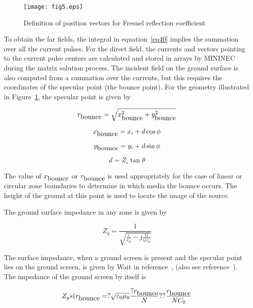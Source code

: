 \documentclass[12pt]{article}
\begin{document}
\begin{figure}[htb]
\centerline{\texttt{[image: fig5.eps]}}
\caption{Definition of position vectors for Fresnel reflection coefficient}
\label{fig5}
\end{figure}

To obtain the far fields, the integral in equation~\eqref{eq40} implies
the summation over all the current pulses. For the direct field, the
currents and vectors pointing to the current pulse centers are
calculated and stored in arrays by MININEC during the matrix solution
process. The incident field on the ground surface is also computed from
a summation over the currents, but this requires the coordinates of the
specular point (the bounce point). For the geometry illustrated in
Figure~\ref{fig5}, the specular point is given by

\begin{equation}
r_{\mbox{bounce}} = \sqrt{x_{\mbox{bounce}}^2 + y_{\mbox{bounce}}^2}
\label{eq51}
\end{equation}

\begin{equation}
x_{\mbox{bounce}} = x_i + d\cos\phi
\label{eq52}
\end{equation}

\begin{equation}
y_{\mbox{bounce}} = y_i + d\sin\phi
\label{eq53}
\end{equation}

\begin{equation}
d = Z_i \tan\theta
\label{eq54}
\end{equation}

The value of $x_{\mbox{bounce}}$ or $r_{\mbox{bounce}}$ is used
appropriately for the case of linear or circular zone boundaries to
determine in which media the bounce occurs. The height of the ground at
this point is used to locate the image of the source.

The ground surface impedance in any zone is given by

\begin{equation}
Z_g = \frac{1}{\sqrt{\frac{\varepsilon}{\varepsilon_0}
                    - j\frac{G}{\omega\varepsilon_0}}}
\label{eq55}
\end{equation}

The surface impedance, when a ground screen is present and the specular
point lies on the ground screen, is given by Wait in
reference~\cite{r14}, (also see reference~\cite{r4}). The impedance of
the ground screen by itself is

\[
Z_gs (r_{\mbox{bounce}} = ?\sqrt{\varepsilon_0\mu_0}
\frac{?r_{\mbox{bounce}}}{N} ?? \frac{r_{\mbox{bounce}}}{NC_0}
\]
\end{document}
